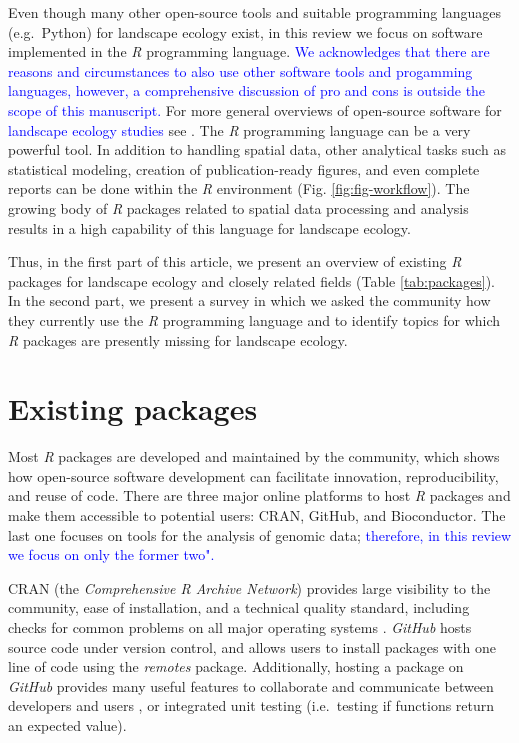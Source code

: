 \documentclass[smallextended]{svjour3}       %
\begin{document}
Even though many other open-source tools \cite{QGISDevelopmentTeam2016,GRASSDevelopmentTeam2017,Porta2017} and suitable programming languages (e.g.~Python) for landscape ecology exist, in this review we focus on software implemented in the \emph{R} programming language.
\textcolor{blue}{We acknowledges that there are reasons and circumstances to also use other software tools and progamming languages, however, a comprehensive discussion of pro and cons is outside the scope of this manuscript.}
For more general overviews of open-source software for \textcolor{blue}{landscape ecology studies} see \cite{Jolma2008,Steiniger2009,Steiniger2009a,Istvan2012}.
The \emph{R} programming language can be a very powerful tool. In addition to handling spatial data, other analytical tasks such as statistical modeling, creation of publication-ready figures, and even complete reports can be done within the \emph{R} environment (Fig. \ref{fig:fig-workflow}).
The growing body of \emph{R} packages related to spatial data processing and analysis results in a high capability of this language for landscape ecology.

Thus, in the first part of this article, we present an overview of existing \emph{R} packages for landscape ecology and closely related fields (Table \ref{tab:packages}).
In the second part, we present a survey in which we asked the community how they currently use the \emph{R} programming language and to identify topics for which \emph{R} packages are presently missing for landscape ecology.

\hypertarget{sec:existing_packages}{%
\section{Existing packages}\label{sec:existing_packages}}

Most \emph{R} packages are developed and maintained by the community, which shows how open-source software development can facilitate innovation, reproducibility, and reuse of code.
There are three major online platforms to host \emph{R} packages and make them accessible to potential users: CRAN, GitHub, and Bioconductor.
The last one focuses on tools for the analysis of genomic data; \textcolor{blue}{therefore, in this review we focus on only the former two".}

CRAN (the \emph{Comprehensive R Archive Network}) provides large visibility to the community, ease of installation, and a technical quality standard, including checks for common problems on all major operating systems \cite{Wickham2015}.
\emph{GitHub} hosts source code under version control, and allows users to install packages with one line of code using the \emph{remotes} \cite{Hester2020} package.
Additionally, hosting a package on \emph{GitHub} provides many useful features to collaborate and communicate between developers and users \cite{Wickham2015}, or integrated unit testing (i.e.~testing if functions return an expected value).
\end{document}
